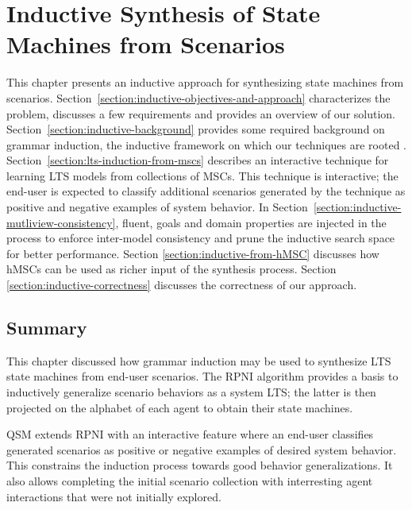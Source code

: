 \chapter{Inductive Synthesis of State Machines from Scenarios\label{chapter:inductive-synthesis}}

This chapter presents an inductive approach for synthesizing state machines from scenarios. Section~\ref{section:inductive-objectives-and-approach} characterizes the problem, discusses a few requirements and provides an overview of our solution. Section~\ref{section:inductive-background} provides some required background on grammar induction, the inductive framework on which our techniques are rooted \cite{Gold:1978}. Section~\ref{section:lts-induction-from-mscs} describes an interactive technique for learning LTS models from collections of MSCs. This technique is interactive; the end-user is expected to classify additional scenarios generated by the technique as positive and negative examples of system behavior. In Section~\ref{section:inductive-mutliview-consistency}, fluent, goals and domain properties are injected in the process to enforce inter-model consistency and prune the inductive search space for better performance. Section \ref{section:inductive-from-hMSC} discusses how hMSCs can be used as richer input of the synthesis process. Section \ref{section:inductive-correctness} discusses the correctness of our approach.









\section*{Summary}

This chapter discussed how grammar induction may be used to synthesize LTS state machines from end-user scenarios. The RPNI algorithm provides a basis to inductively generalize scenario behaviors as a system LTS; the latter is then projected on the alphabet of each agent to obtain their state machines.

QSM extends RPNI with an interactive feature where an end-user classifies generated scenarios as positive or negative examples of desired system behavior. This constrains the induction process towards good behavior generalizations. It also allows completing the initial scenario collection with interresting agent interactions that were not initially explored.

